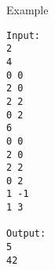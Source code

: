 Example  
\begin{verbatim}
Input:
2
4
0 0
2 0
2 2
0 2
6
0 0
2 0
2 2
0 2
1 -1
1 3

Output:
5
42
\end{verbatim}
